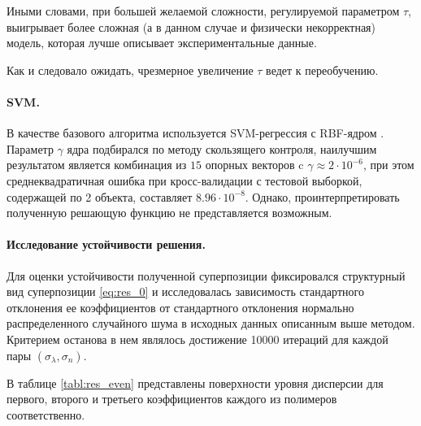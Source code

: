\documentclass[12pt,a4paper]{article}
\begin{document}
Иными словами, при большей желаемой сложности,
регулируемой параметром $\tau$, выигрывает более сложная (а в данном случае и
физически некорректная) модель, которая лучше описывает экспериментальные данные.

Как и следовало ожидать, чрезмерное увеличение $\tau$ ведет к переобучению.

\paragraph{SVM.}

В качестве базового алгоритма используется SVM-регрессия с RBF-ядром \cite{Vapnik79}.
Параметр $\gamma$ ядра подбирался по методу скользящего контроля, наилучшим результатом является
комбинация из $15$ опорных векторов c $\gamma \approx 2 \cdot 10^{-6}$, при этом
среднеквадратичная ошибка при кросс-валидации с тестовой выборкой, содержащей по 2
объекта, составляет $8.96 \cdot 10^{-8}$. Однако, проинтерпретировать полученную
решающую функцию не представляется возможным.

\paragraph{Исследование устойчивости решения.}

Для оценки устойчивости полученной суперпозиции фиксировался структурный вид
суперпозиции \eqref{eq:res_0} и исследовалась
зависимость стандартного отклонения ее коэффициентов от стандартного отклонения
нормально распределенного случайного шума в исходных данных описанным выше методом.
Критерием останова в нем являлось достижение 10000 итераций для каждой пары
$(\sigma_{\lambda}, \sigma_n)$.

В таблице \ref{tabl:res_even} представлены
поверхности уровня дисперсии для первого, второго и третьего коэффициентов каждого из полимеров
соответственно.
\end{document}

